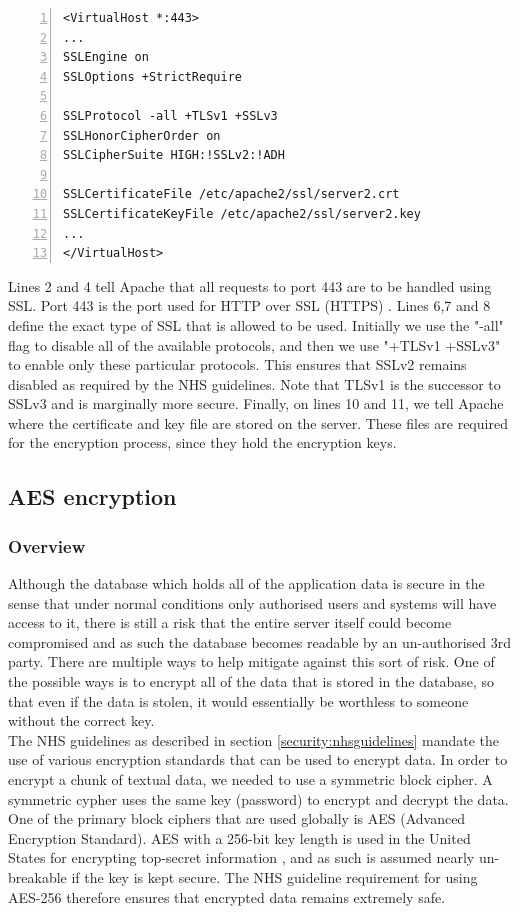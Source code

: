 \documentclass[11pt]{article}
\begin{document}
\begin{lstlisting}[float=ht,numbers=left,frame=lines,caption="Apache httpd.conf",label=apachehttpd,basicstyle=\ttfamily\small,showstringspaces=false]
<VirtualHost *:443>
...
SSLEngine on
SSLOptions +StrictRequire

SSLProtocol -all +TLSv1 +SSLv3
SSLHonorCipherOrder on
SSLCipherSuite HIGH:!SSLv2:!ADH

SSLCertificateFile /etc/apache2/ssl/server2.crt
SSLCertificateKeyFile /etc/apache2/ssl/server2.key
...
</VirtualHost>
\end{lstlisting}


Lines 2 and 4 tell Apache that all requests to port 443 are to be handled using SSL. Port 443 is the port used for HTTP over SSL (HTTPS) \cite{port443}. Lines 6,7 and 8 define the exact type of SSL that is allowed to be used. Initially we use the "-all" flag to disable all of the available protocols, and then we use "+TLSv1 +SSLv3" to enable only these particular protocols. This ensures that SSLv2 remains disabled as required by the NHS guidelines. Note that TLSv1 is the successor to SSLv3 and is marginally more secure. Finally, on lines 10 and 11, we tell Apache where the certificate and key file are stored on the server. These files are required for the encryption process, since they hold the encryption keys.

\subsection{AES encryption}
\subsubsection{Overview}

Although the database which holds all of the application data is secure in the sense that under normal conditions only authorised users and systems will have access to it, there is still a risk that the entire server itself could become compromised and as such the database becomes readable by an un-authorised 3rd party. There are multiple ways to help mitigate against this sort of risk. One of the possible ways is to encrypt all of the data that is stored in the database, so that even if the data is stolen, it would essentially be worthless to someone without the correct key. 
\\ \indent
The NHS guidelines as described in section \ref{security:nhsguidelines} mandate the use of various encryption standards that can be used to encrypt data. In order to encrypt a chunk of textual data, we needed to use a symmetric block cipher. A symmetric cypher uses the same key (password) to encrypt and decrypt the data. One of the primary block ciphers that are used globally is AES (Advanced Encryption Standard). AES with a 256-bit key length is used in the United States for encrypting top-secret information \cite{aes:nsa}, and as such is assumed nearly un-breakable if the key is kept secure. The NHS guideline requirement for using AES-256 therefore ensures that encrypted data remains extremely safe.
\end{document}
